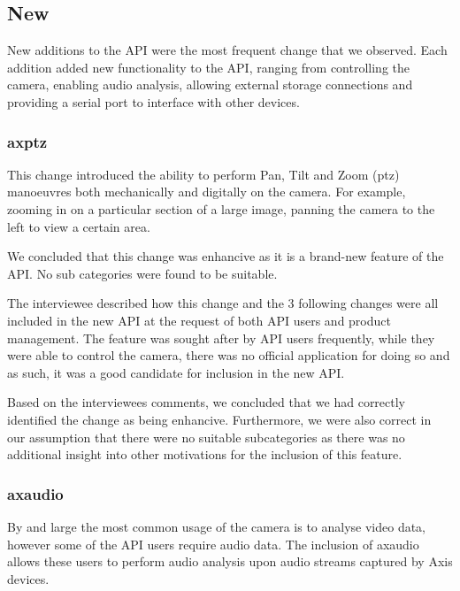 \documentclass{sig-alternate}
\begin{document}
\subsection{New}

New additions to the API were the most frequent change that we observed. Each addition added new functionality to the API, ranging from controlling the camera, enabling audio analysis, allowing external storage connections and providing a serial port to interface with other devices.

\subsubsection{axptz}

This change introduced the ability to perform Pan, Tilt and Zoom (ptz) manoeuvres both mechanically and digitally on the camera. For example, zooming in on a particular section of a large image, panning the camera to the left to view a certain area. 

We concluded that this change was enhancive as it is a brand-new feature of the API. No sub categories were found to be suitable.

The interviewee described how this change and the 3 following changes were all included in the new API at the request of both API users and product management. The feature was sought after by API users frequently, while they were able to control the camera, there was no official application for doing so and as such, it was a good candidate for inclusion in the new API.

Based on the interviewees comments, we concluded that we had correctly identified the change as being enhancive. Furthermore, we were also correct in our assumption that there were no suitable subcategories as there was no additional insight into other motivations for the inclusion of this feature. 

\subsubsection{axaudio}

By and large the most common usage of the camera is to analyse video data, however some of the API users require audio data. The inclusion of axaudio allows these users to perform audio analysis upon audio streams captured by Axis devices. 
\end{document}
